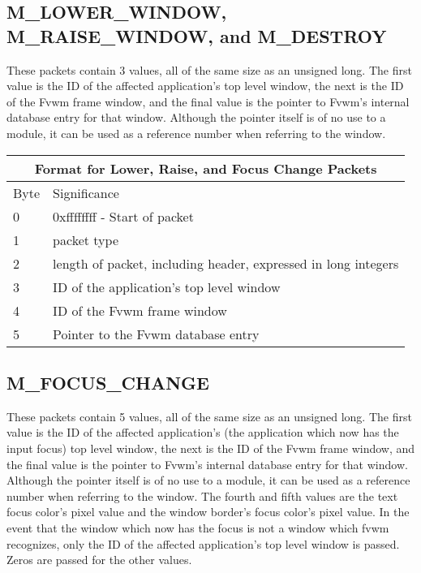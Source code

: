 \subsection{M\_LOWER\_WINDOW, M\_RAISE\_WINDOW, and M\_DESTROY}
These packets contain 3 values, all of the same size as an unsigned
long. The first value is the ID of the affected application's top level
window, the next is the ID of the Fvwm frame window, and the final
value is the pointer to Fvwm's internal database entry for that
window. Although the pointer itself is of no use to a module, it can
be used as a reference number when referring to the window.

\begin{table}
\begin{center}
\begin{tabular}[h]{|l|l|} \hline
\multicolumn{2}{|c|}{Format for Lower, Raise, and Focus Change Packets} \\ \hline
Byte &Significance \\\hline
0    & 0xffffffff - Start of packet \\
1    & packet type \\
2    & length of packet, including header, expressed in long integers
\\ \hline
3    & ID of the application's top level window \\
4    & ID of the Fvwm frame window \\
5    & Pointer to the Fvwm database entry \\ \hline
\end{tabular}
\end{center}
\end{table}


\subsection{M\_FOCUS\_CHANGE}
These packets contain 5 values, all of the same size as an unsigned
long. The first value is the ID of the affected application's (the
application which now has the input focus) top level
window, the next is the ID of the Fvwm frame window, and the final
value is the pointer to Fvwm's internal database entry for that
window. Although the pointer itself is of no use to a module, it can
be used as a reference number when referring to the window. The fourth
and fifth values are the text focus color's pixel value and the window
border's focus color's pixel value. In the
event that the window which now has the focus is not a window which
fvwm recognizes, only the ID of the affected application's top level
window is passed. Zeros are passed for the other values.

